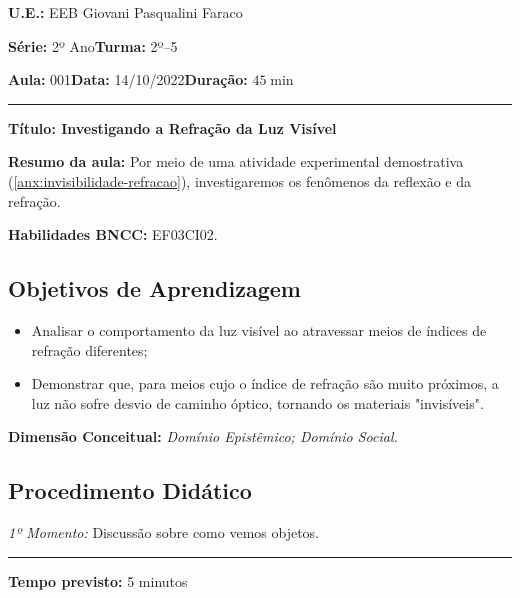         \noindent \textbf{U.E.:} EEB Giovani Pasqualini Faraco
        
        \noindent \textbf{Série:} 2º Ano\hfill{}\textbf{Turma:} 2º--5
        
        \noindent \textbf{Aula:} 001\hfill{}\textbf{Data:} 14/10/2022\hfill{}\textbf{Duração:} $45\min$
        \rule{\textwidth}{.5pt}
        \bigskip{}  
        
        \noindent \begin{center}
        \textbf{Título: Investigando a Refração da Luz Visível}
        \par\end{center}

        \noindent \textbf{Resumo da aula:} Por meio de uma atividade experimental demostrativa (\autoref{anx:invisibilidade-refracao}), investigaremos os fenômenos da reflexão e da refração.

        \par\noindent \textbf{Habilidades BNCC:} EF03CI02.
        \vfill
        
        \subsection*{Objetivos de Aprendizagem}
        \begin{itemize}
            \item Analisar o comportamento da luz visível ao atravessar meios de índices de refração diferentes;
            \item Demonstrar que, para meios cujo o índice de refração são muito próximos, a luz não sofre desvio de caminho óptico, tornando os materiais "invisíveis".
        \end{itemize}
        
        \medskip{}
        \vfill
        \noindent \textbf{Dimensão Conceitual:} \emph{Domínio Epistêmico; Domínio Social.}
        
        
        \subsection*{Procedimento Didático} 
        \noindent \emph{1º Momento:} Discussão sobre como vemos objetos.
        \par\noindent\rule{.3\textwidth}{.5pt}  
        \par\noindent \textbf{Tempo previsto:} 5 minutos

